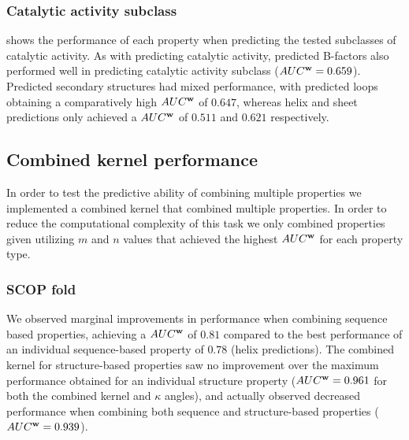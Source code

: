 \subsubsection{Catalytic activity subclass}
 shows the performance of each property when predicting the tested subclasses of catalytic activity.  As with predicting catalytic activity, predicted B-factors also performed well in predicting catalytic activity subclass ($AUC^{\bf{w}}=0.659$).  Predicted secondary structures had mixed performance, with predicted loops obtaining a comparatively high $AUC^{\bf{w}}$ of $0.647$, whereas helix and sheet predictions only achieved a $AUC^{\bf{w}}$ of $0.511$ and $0.621$ respectively.



\subsection{Combined kernel performance}

In order to test the predictive ability of combining multiple properties we implemented a combined kernel that combined multiple properties.  In order to reduce the computational complexity of this task we only combined properties given utilizing $m$ and $n$ values that achieved the highest $AUC^{\bf{w}}$ for each property type.

\subsubsection{SCOP fold}
We observed marginal improvements in performance when combining sequence based properties, achieving a $AUC^{\bf{w}}$ of $0.81$ compared to the best performance of an individual sequence-based property of $0.78$ (helix predictions).  The combined kernel for structure-based properties saw no improvement over the maximum performance obtained for an individual structure property ($AUC^{\bf{w}} = 0.961$ for both the combined kernel and $\kappa$ angles), and actually observed decreased performance when combining both sequence and structure-based properties ($AUC^{\bf{w}}= 0.939$).


